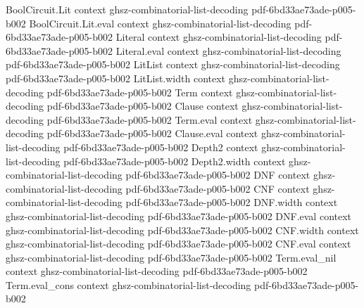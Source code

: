 \begin{theorem}
\label{BooleanAnalysis.walsh_expansion}
\leanok
{}
\proofstep
  {BoolCircuit.Lit}
  {context}
  {ghsz-combinatorial-list-decoding}
  {pdf-6bd33ae73ade-p005-b002}
\proofstep
  {BoolCircuit.Lit.eval}
  {context}
  {ghsz-combinatorial-list-decoding}
  {pdf-6bd33ae73ade-p005-b002}
\proofstep
  {Literal}
  {context}
  {ghsz-combinatorial-list-decoding}
  {pdf-6bd33ae73ade-p005-b002}
\proofstep
  {Literal.eval}
  {context}
  {ghsz-combinatorial-list-decoding}
  {pdf-6bd33ae73ade-p005-b002}
\proofstep
  {LitList}
  {context}
  {ghsz-combinatorial-list-decoding}
  {pdf-6bd33ae73ade-p005-b002}
\proofstep
  {LitList.width}
  {context}
  {ghsz-combinatorial-list-decoding}
  {pdf-6bd33ae73ade-p005-b002}
\proofstep
  {Term}
  {context}
  {ghsz-combinatorial-list-decoding}
  {pdf-6bd33ae73ade-p005-b002}
\proofstep
  {Clause}
  {context}
  {ghsz-combinatorial-list-decoding}
  {pdf-6bd33ae73ade-p005-b002}
\proofstep
  {Term.eval}
  {context}
  {ghsz-combinatorial-list-decoding}
  {pdf-6bd33ae73ade-p005-b002}
\proofstep
  {Clause.eval}
  {context}
  {ghsz-combinatorial-list-decoding}
  {pdf-6bd33ae73ade-p005-b002}
\proofstep
  {Depth2}
  {context}
  {ghsz-combinatorial-list-decoding}
  {pdf-6bd33ae73ade-p005-b002}
\proofstep
  {Depth2.width}
  {context}
  {ghsz-combinatorial-list-decoding}
  {pdf-6bd33ae73ade-p005-b002}
\proofstep
  {DNF}
  {context}
  {ghsz-combinatorial-list-decoding}
  {pdf-6bd33ae73ade-p005-b002}
\proofstep
  {CNF}
  {context}
  {ghsz-combinatorial-list-decoding}
  {pdf-6bd33ae73ade-p005-b002}
\proofstep
  {DNF.width}
  {context}
  {ghsz-combinatorial-list-decoding}
  {pdf-6bd33ae73ade-p005-b002}
\proofstep
  {DNF.eval}
  {context}
  {ghsz-combinatorial-list-decoding}
  {pdf-6bd33ae73ade-p005-b002}
\proofstep
  {CNF.width}
  {context}
  {ghsz-combinatorial-list-decoding}
  {pdf-6bd33ae73ade-p005-b002}
\proofstep
  {CNF.eval}
  {context}
  {ghsz-combinatorial-list-decoding}
  {pdf-6bd33ae73ade-p005-b002}
\proofstep
  {Term.eval_nil}
  {context}
  {ghsz-combinatorial-list-decoding}
  {pdf-6bd33ae73ade-p005-b002}
\proofstep
  {Term.eval_cons}
  {context}
  {ghsz-combinatorial-list-decoding}
  {pdf-6bd33ae73ade-p005-b002}

\end{theorem}
